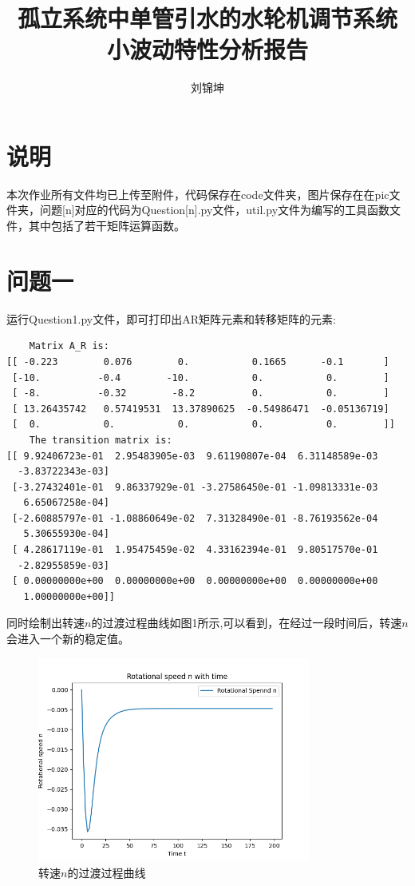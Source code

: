 \documentclass[UTF8]{ctexart}
\title{孤立系统中单管引水的水轮机调节系统\\小波动特性分析报告}
\author{刘锦坤}
\date{}
\begin{document}
\fancyfoot[C]{\thepage}

\maketitle
\tableofcontents

\newpage

\section{说明}

本次作业所有文件均已上传至附件，代码保存在code文件夹，图片保存在在pic文件夹，问题[n]对应的代码为Question[n].py文件，util.py文件为编写的工具函数文件，其中包括了若干矩阵运算函数。

\section{问题一}

运行Question1.py文件，即可打印出AR矩阵元素和转移矩阵的元素:

\begin{verbatim}
    Matrix A_R is:
[[ -0.223        0.076        0.           0.1665      -0.1       ]
 [-10.          -0.4        -10.           0.           0.        ]
 [ -8.          -0.32        -8.2          0.           0.        ]
 [ 13.26435742   0.57419531  13.37890625  -0.54986471  -0.05136719]
 [  0.           0.           0.           0.           0.        ]]
    The transition matrix is:
[[ 9.92406723e-01  2.95483905e-03  9.61190807e-04  6.31148589e-03
  -3.83722343e-03]
 [-3.27432401e-01  9.86337929e-01 -3.27586450e-01 -1.09813331e-03
   6.65067258e-04]
 [-2.60885797e-01 -1.08860649e-02  7.31328490e-01 -8.76193562e-04
   5.30655930e-04]
 [ 4.28617119e-01  1.95475459e-02  4.33162394e-01  9.80517570e-01
  -2.82955859e-03]
 [ 0.00000000e+00  0.00000000e+00  0.00000000e+00  0.00000000e+00
   1.00000000e+00]]
\end{verbatim}

同时绘制出转速$n$的过渡过程曲线如图1所示,可以看到，在经过一段时间后，转速$n$会进入一个新的稳定值。

\begin{figure}[htbp]
    \centering
    \includegraphics[width=0.8\textwidth]{pic/n-t.png}
    \caption{转速$n$的过渡过程曲线}
\end{figure}
\end{document}
